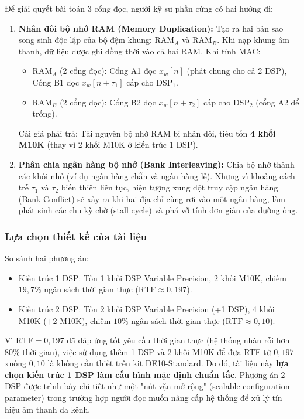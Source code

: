 Để giải quyết bài toán 3 cổng đọc, người kỹ sư phần cứng có hai hướng đi:
\begin{enumerate}[leftmargin=1.5em, itemsep=2pt]
    \item \textbf{Nhân đôi bộ nhớ RAM (Memory Duplication):}
    Tạo ra hai bản sao song sinh độc lập của bộ đệm khung: $\text{RAM}_A$ và $\text{RAM}_B$. Khi nạp khung âm thanh, dữ liệu được ghi đồng thời vào cả hai RAM. Khi tính MAC:
    \begin{itemize}[leftmargin=1.2em, itemsep=1pt]
        \item $\text{RAM}_A$ (2 cổng đọc): Cổng A1 đọc $x_w[n]$ (phát chung cho cả 2 DSP), Cổng B1 đọc $x_w[n+\tau_1]$ cấp cho $\text{DSP}_1$.
        \item $\text{RAM}_B$ (2 cổng đọc): Cổng B2 đọc $x_w[n+\tau_2]$ cấp cho $\text{DSP}_2$ (cổng A2 để trống).
    \end{itemize}
    Cái giá phải trả: Tài nguyên bộ nhớ RAM bị nhân đôi, tiêu tốn \textbf{4 khối M10K} (thay vì 2 khối M10K ở kiến trúc 1 DSP).
    \item \textbf{Phân chia ngân hàng bộ nhớ (Bank Interleaving):}
    Chia bộ nhớ thành các khối nhỏ (ví dụ ngân hàng chẵn và ngân hàng lẻ). Nhưng vì khoảng cách trễ $\tau_1$ và $\tau_2$ biến thiên liên tục, hiện tượng xung đột truy cập ngân hàng (Bank Conflict) sẽ xảy ra khi hai địa chỉ cùng rơi vào một ngân hàng, làm phát sinh các chu kỳ chờ (stall cycle) và phá vỡ tính đơn giản của đường ống.
\end{enumerate}

\subsubsection*{Lựa chọn thiết kế của tài liệu}
So sánh hai phương án:
\begin{itemize}[leftmargin=1.5em, itemsep=2pt]
    \item Kiến trúc 1 DSP: Tốn 1 khối DSP Variable Precision, 2 khối M10K, chiếm $19{,}7\%$ ngân sách thời gian thực ($\text{RTF} \approx 0{,}197$).
    \item Kiến trúc 2 DSP: Tốn 2 khối DSP Variable Precision (+1 DSP), 4 khối M10K (+2 M10K), chiếm $10\%$ ngân sách thời gian thực ($\text{RTF} \approx 0{,}10$).
\end{itemize}

Vì $\text{RTF} = 0{,}197$ đã đáp ứng tốt yêu cầu thời gian thực (hệ thống nhàn rỗi hơn $80\%$ thời gian), việc sử dụng thêm 1 DSP và 2 khối M10K để đưa RTF từ $0{,}197$ xuống $0{,}10$ là không cần thiết trên kit DE10-Standard. Do đó, tài liệu này \textbf{lựa chọn kiến trúc 1 DSP làm cấu hình mặc định chuẩn tắc}. Phương án 2 DSP được trình bày chi tiết như một "nút vặn mở rộng" (scalable configuration parameter) trong trường hợp người đọc muốn nâng cấp hệ thống để xử lý tín hiệu âm thanh đa kênh.

